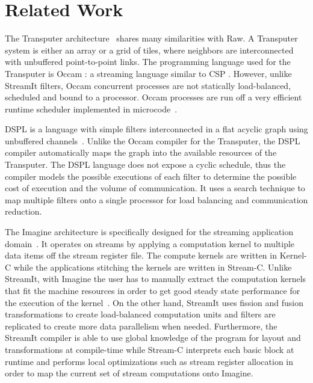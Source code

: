 \section{Related Work}
\label{sec:related}

The Transputer architecture~\cite{transputer88} shares many
similarities with Raw.  A Transputer system is either an array or a
grid of tiles, where neighbors are interconnected with unbuffered
point-to-point links. The programming language used for the Transputer
is Occam \cite{occammanual}: a streaming language similar to CSP
\cite{Hoare78}.  However, unlike StreamIt filters, Occam concurrent
processes are not statically load-balanced, scheduled and bound to a
processor. Occam processes are run off a very efficient runtime
scheduler implemented in microcode~\cite{may87communicating}.

DSPL is a language with simple filters interconnected in a flat acyclic
graph using unbuffered channels~\cite{Thiel93}.  Unlike the Occam
compiler for the Transputer, the DSPL compiler automatically maps the
graph into the available resources of the Transputer. The DSPL language
does not expose a cyclic schedule, thus the compiler models the
possible executions of each filter to determine the possible cost of
execution and the volume of communication. It uses a search technique
to map multiple filters onto a single processor for load balancing and
communication reduction. 

The Imagine architecture is specifically designed for the streaming
application domain~\cite{rixner98bandwidthefficient}.  It operates on
streams by applying a computation kernel to multiple data items off
the stream register file.  The compute kernels are written in Kernel-C
while the applications stitching the kernels are written in Stream-C.
Unlike StreamIt, with Imagine the user has to manually extract the
computation kernels that fit the machine resources in order to get
good steady state performance for the execution of the
kernel~\cite{kapasi:2001:ss}.  On the other hand, StreamIt uses
fission and fusion transformations to create load-balanced computation
units and filters are replicated to create more data parallelism when
needed.  Furthermore, the StreamIt compiler is able to use global
knowledge of the program for layout and transformations at
compile-time while Stream-C interprets each basic block at runtime and
performs local optimizations such as stream register allocation in
order to map the current set of stream computations onto Imagine.

